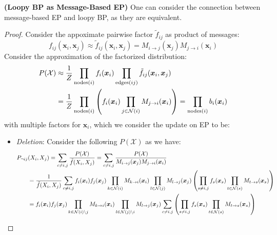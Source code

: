 \begin{proposition}{\textbf{(Loopy BP as Message-Based EP)}}
    One can consider the connection between message-based EP and loopy BP, as they are equivalent.
\end{proposition}
\begin{proof}
    Consider the appoximate pairwise factor $\tilde{f}_{ij}$ as product of messages:
    \begin{equation*}
        f_{ij}(\boldsymbol x_i, \boldsymbol x_j) \approx \tilde{f}_{ij}(\boldsymbol x_i, \boldsymbol x_j) = M_{i\rightarrow j}(\boldsymbol x_j)M_{j\rightarrow i}(\boldsymbol x_i)
    \end{equation*}
    Consider the approximation of the factorized distribution:
    \begin{equation*}
    \begin{aligned}
        P(\mathcal{X}) &\approx \frac{1}{Z}\prod_{\text{nodes}(i)}f_i(\boldsymbol x_i) \prod_{\text{edges}(ij)}\tilde{f}_{ij}(\boldsymbol x_i, \boldsymbol x_j) \\
        &= \frac{1}{Z}\prod_{\text{nodes}(i)}\left( f_i(\boldsymbol x_i)\prod_{j\in\mathcal{N}(i)}M_{j\rightarrow i}(\boldsymbol x_i) \right) = \prod_{\text{nodes}(i)}b_i(\boldsymbol x_i)
    \end{aligned}
    \end{equation*}
    with multiple factors for $\boldsymbol x_i$, which we consider the update on EP to be:
    \begin{itemize}
        \item \emph{Deletion}: Consider the following $P(\mathcal{X})$ as we have:
        \begin{equation*}
        \begin{aligned}
            P_{\neg ij}&(X_i, X_j) = \sum_{c \ne i, j} \frac{P(\mathcal{X})}{\tilde{f}(X_i, X_j)} = \sum_{c \ne i, j} \frac{P(\mathcal{X})}{ M_{i\rightarrow j}(\boldsymbol x_j) M_{j\rightarrow i}(\boldsymbol x_i)} \\ 
            &= \frac{1}{\tilde{f}(X_i, X_j)}\sum_{c \ne i, j}f_i(\boldsymbol x_i)f_j(\boldsymbol x_j)\prod_{k\in\mathcal{N}(i)}M_{k\rightarrow i}(\boldsymbol x_i)\prod_{l\in\mathcal{N}(j)}M_{l\rightarrow j}(\boldsymbol x_j) \bracka{\prod_{s\ne i, j} f_s(\boldsymbol x_s) \prod_{t\in\mathcal{N}(s)}  M_{t\rightarrow s} (\boldsymbol x_s) } \\
            &= f_i(\boldsymbol x_i)f_j(\boldsymbol x_j)\prod_{k\in\mathcal{N}(i) \backslash j}M_{k\rightarrow i}(\boldsymbol x_i)\prod_{l\in\mathcal{N}(j)\backslash i}M_{l\rightarrow j}(\boldsymbol x_j)\sum_{c \ne i, j}\bracka{\prod_{s\ne i, j} f_s(\boldsymbol x_s) \prod_{t\in\mathcal{N}(s)}  M_{t\rightarrow s} (\boldsymbol x_s) } \\

\end{aligned}
\end{equation*}
\end{itemize}
\end{proof}
